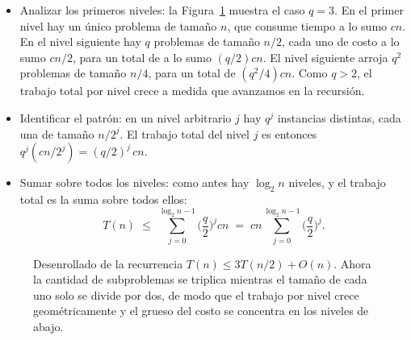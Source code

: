 \documentclass[12pt, spanish, oneside, openany]{book}
\theoremstyle{uprightplain}
\theoremstyle{definition}
\theoremstyle{remark}
\theoremstyle{definition}
\begin{document}
\begin{itemize}
    \item Analizar los primeros niveles: la Figura~\ref{fig:desenrollo-q3} muestra el caso $q=3$. En el primer nivel hay un único problema de tamaño $n$, que consume tiempo a lo sumo $cn$. En el nivel siguiente hay $q$ problemas de tamaño $n/2$, cada uno de costo a lo sumo $cn/2$, para un total de a lo sumo $(q/2)cn$. El nivel siguiente arroja $q^2$ problemas de tamaño $n/4$, para un total de $(q^2/4)cn$. Como $q>2$, el trabajo total por nivel crece a medida que avanzamos en la recursión.

    \item Identificar el patrón: en un nivel arbitrario $j$ hay $q^j$ instancias distintas, cada una de tamaño $n/2^j$. El trabajo total del nivel $j$ es entonces $q^j(cn/2^j)=(q/2)^j\,cn$.

    \item Sumar sobre todos los niveles: como antes hay $\log_2 n$ niveles, y el trabajo total es la suma sobre todos ellos:
    \[
    T(n) \;\le\; \sum_{j=0}^{\log_2 n-1}\Big(\frac{q}{2}\Big)^{\!j} cn
          \;=\; cn \sum_{j=0}^{\log_2 n-1}\Big(\frac{q}{2}\Big)^{\!j}.
    \]
\end{itemize}

\begin{figure}[H]
\centering
{}
\caption{Desenrollado de la recurrencia $T(n)\le 3T(n/2)+O(n)$. Ahora la
cantidad de subproblemas se triplica mientras el tamaño de cada uno solo se
divide por dos, de modo que el trabajo por nivel crece geométricamente y el
grueso del costo se concentra en los niveles de abajo.}
\label{fig:desenrollo-q3}
\end{figure}
\end{document}

